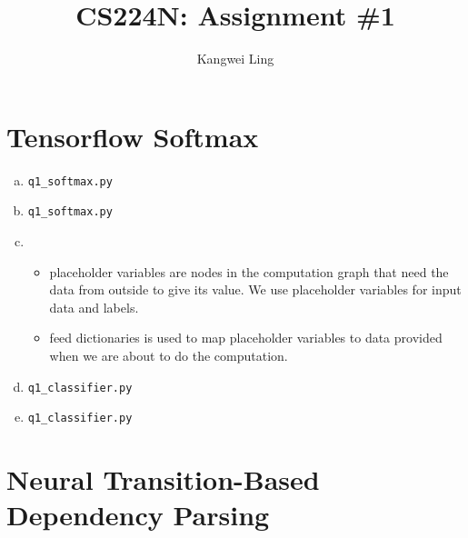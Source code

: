 \documentclass[11pt]{article}
\title{CS224N: Assignment \#1}
\author{Kangwei Ling}
\begin{document}
\maketitle

\section{Tensorflow Softmax}
\label{sec:1}
\begin{enumerate}[(a)]
\item \verb|q1_softmax.py|
\item \verb|q1_softmax.py|
\item
  \begin{itemize}
  \item placeholder variables are nodes in the computation graph that need
    the data from outside to give its value. We use placeholder variables for
    input data and labels.
  \item feed dictionaries is used to map placeholder variables to data provided
    when we are about to do the computation.
  \end{itemize}
\item \verb|q1_classifier.py|
\item \verb|q1_classifier.py|
\end{enumerate}

\section{Neural Transition-Based Dependency Parsing}
\label{sec:2}
\end{document}
